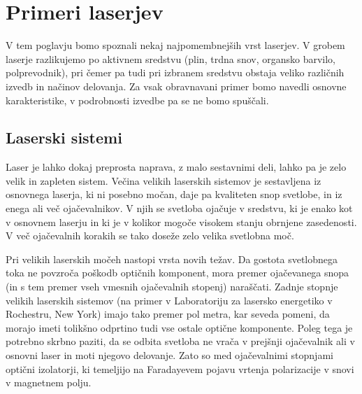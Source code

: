\chapter{Primeri laserjev}
\label{chap:Primeri}
V tem poglavju bomo spoznali nekaj najpomembnejših vrst laserjev.
V grobem laserje razlikujemo po aktivnem sredstvu 
(plin, trdna snov, organsko barvilo, polprevodnik), pri čemer pa tudi pri izbranem
sredstvu obstaja veliko različnih izvedb in načinov delovanja. Za vsak 
obravnavani primer bomo navedli osnovne karakteristike, v podrobnosti 
izvedbe pa se ne bomo spuščali. 

\section{Laserski sistemi}
Laser  je lahko dokaj preprosta naprava, z malo sestavnimi deli, 
lahko pa je zelo velik in zapleten sistem. Večina velikih laserskih sistemov
je sestavljena iz osnovnega laserja, ki ni posebno močan, daje pa kvaliteten
snop svetlobe, in iz enega ali več ojačevalnikov. V njih se svetloba 
ojačuje v sredstvu, ki je enako kot v osnovnem laserju in ki je v kolikor 
mogoče visokem stanju obrnjene zasedenosti. V več ojačevalnih korakih 
se tako doseže zelo velika svetlobna moč. 

Pri velikih laserskih močeh nastopi vrsta novih težav. Da gostota 
svetlobnega toka ne povzroča poškodb optičnih komponent, mora 
premer ojačevanega snopa (in s tem premer vseh vmesnih ojačevalnih stopenj) 
naraščati. Zadnje stopnje velikih laserskih sistemov
(na primer v Laboratoriju za lasersko energetiko v Rochestru, New York) imajo 
tako premer pol metra, kar seveda pomeni, da morajo imeti tolikšno odprtino 
tudi vse ostale optične komponente. Poleg tega je
potrebno skrbno paziti, da se odbita svetloba ne vrača v prejšnji
ojačevalnik ali v osnovni laser in moti njegovo delovanje. Zato so med
ojačevalnimi stopnjami optični izolatorji, ki temeljijo na Faradayevem
pojavu vrtenja polarizacije v snovi v magnetnem polju.

